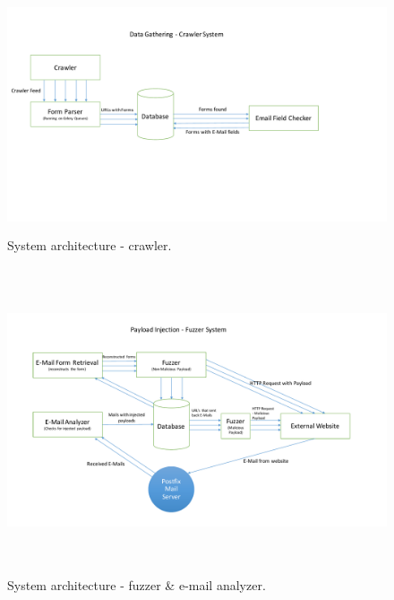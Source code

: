 \begin{figure}
	\centering
	\includegraphics[width=14cm, height=7cm]{System/crawler_design}
	\caption{System architecture - crawler.}
	\label{fig:crawler}
\end{figure}


\begin{figure}
	\centering
	\includegraphics[width=16cm, height=9cm]{System/fuzzer_design}
	\caption{System architecture - fuzzer {\&} e-mail analyzer.}
	\label{fig:fuzzer}
\end{figure}
